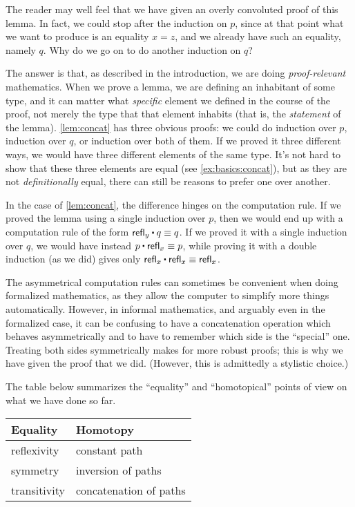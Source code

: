 The reader may well feel that we have given an overly convoluted proof of this lemma.
In fact, we could stop after the induction on $p$, since at that point what we want to produce is an equality $x=z$, and we already have such an equality, namely $q$.
Why do we go on to do another induction on $q$?

The answer is that, as described in the introduction, we are doing \emph{proof-relevant} mathematics.
When we prove a lemma, we are defining an inhabitant of some type, and it can matter what \emph{specific} element we defined in the course of the proof, not merely the type that that element inhabits (that is, the \emph{statement} of the lemma).
\autoref{lem:concat} has three obvious proofs: we could do induction over $p$, induction over $q$, or induction over both of them.
If we proved it three different ways, we would have three different elements of the same type.
It's not hard to show that these three elements are equal (see \autoref{ex:basics:concat}), but as they are not \emph{definitionally} equal, there can still be reasons to prefer one over another.

In the case of \autoref{lem:concat}, the difference hinges on the computation rule.
If we proved the lemma using a single induction over $p$, then we would end up with a computation rule of the form $\refl{y} \ct q \jdeq q$.
If we proved it with a single induction over $q$, we would have instead $p\ct\refl{x}\jdeq p$, while proving it with a double induction (as we did) gives only $\refl{x}\ct\refl{x} \jdeq \refl{x}$.

The asymmetrical computation rules can sometimes be convenient when doing formalized mathematics, as they allow the computer to simplify more things automatically.
However, in informal mathematics, and arguably even in the formalized case, it can be confusing to have a concatenation operation which behaves asymmetrically and to have to remember which side is the ``special'' one.
Treating both sides symmetrically makes for more robust proofs; this is why we have given the proof that we did.
(However, this is admittedly a stylistic choice.)

The table below summarizes the ``equality'' and ``homotopical'' points of view on what we have done so far.
\begin{center}
  \medskip
  \begin{tabular}{ll}
    \toprule
    Equality & Homotopy \\
    \midrule
    reflexivity & constant path\\
    symmetry & inversion of paths\\
    transitivity & concatenation of paths \\
    \bottomrule
  \end{tabular}
  \medskip
\end{center}

